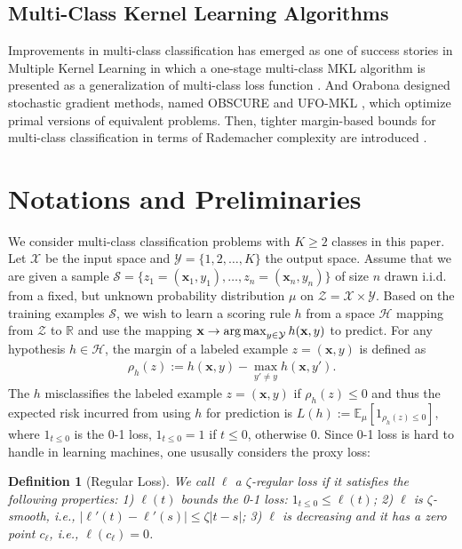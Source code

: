 \documentclass{article}
\newcommand{\argmax}{\operatornamewithlimits{arg\,max}}
\newtheorem{definition}{Definition}
\begin{document}
\subsection{Multi-Class Kernel Learning Algorithms}
Improvements in multi-class classification has emerged as one of success stories in Multiple Kernel Learning \cite{ZienO2007}
in which a one-stage multi-class MKL algorithm is presented as a generalization of multi-class loss function \cite{CrammerS02,TsochantaridisHJA04}.
And Orabona designed stochastic gradient methods, named
OBSCURE \cite{OrabonaJC10} and
UFO-MKL \cite{OrabonaL11}, which optimize primal versions of equivalent problems.
Then, tighter margin-based bounds for multi-class classification in terms of Rademacher complexity are introduced \cite{mohri2012foundations,cortes2013multi}.


\section{Notations and Preliminaries}
We consider multi-class classification problems with $K\geq 2$ classes in this paper.
Let $\mathcal{X}$ be the input space and $\mathcal{Y}=\{1,2,\ldots,K\}$ the output space.
Assume that we are given a sample
$
  \mathcal{S}=\{z_1=(\mathbf  x_1,y_1),\ldots, z_n=(\mathbf  x_n,y_n)\}
$
of size $n$ drawn i.i.d. from a fixed,
but unknown probability distribution $\mu$ on $\mathcal{Z}=\mathcal{X}\times\mathcal{Y}$.
Based on the training examples $\mathcal{S}$,
we wish to learn a scoring rule $h$ from a space $\mathcal{H}$ mapping from $\mathcal{Z}$ to $\mathbb{R}$
and use the mapping $\mathbf x\rightarrow \argmax_{y\in\mathcal{Y}} h(\mathbf x,y)$ to predict.
For any hypothesis $h\in\mathcal{H}$,
the margin of a labeled example $z=(\mathbf x,y)$ is defined as
\begin{align*}
  \rho_h(z):= h(\mathbf x,y)-\max_{y'\not =y} h(\mathbf x,y').
\end{align*}
The $h$ misclassifies the labeled example $z=(\mathbf x,y)$
if $\rho_h(z)\leq 0$ and thus the expected risk incurred
from using $h$ for prediction is
$
  L(h):=\mathbb{E}_\mu[1_{\rho_h(z)\leq 0}],
$
where $1_{t\leq 0}$ is the 0-1 loss,
$1_{t\leq 0}=1$ if $t\leq 0$, otherwise 0.
Since 0-1 loss is hard to handle in learning machines,
one ususally considers the proxy loss:
\begin{definition}[Regular Loss]
  We call $\ell$ a $\zeta$-regular loss if it satisfies the following properties:
  1) $\ell(t)$ bounds the 0-1 loss: $1_{t\leq 0}\leq \ell(t)$;
  2) $\ell$ is $\zeta$-smooth, i.e., $|\ell'(t)-\ell'(s)|\leq \zeta|t-s|$;
  3) $\ell$ is decreasing and it has a zero point $c_\ell$, i.e., $\ell(c_\ell)=0$.
\end{definition}
\end{document}
